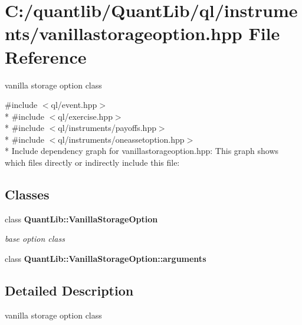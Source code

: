 \section{C\+:/quantlib/\+Quant\+Lib/ql/instruments/vanillastorageoption.hpp File Reference}
\label{vanillastorageoption_8hpp}


vanilla storage option class  


{\ttfamily \#include $<$ql/event.\+hpp$>$}\\*
{\ttfamily \#include $<$ql/exercise.\+hpp$>$}\\*
{\ttfamily \#include $<$ql/instruments/payoffs.\+hpp$>$}\\*
{\ttfamily \#include $<$ql/instruments/oneassetoption.\+hpp$>$}\\*
Include dependency graph for vanillastorageoption.\+hpp\+:
This graph shows which files directly or indirectly include this file\+:
\subsection*{Classes}
\begin{DoxyCompactItemize}
\item 
class {\bf Quant\+Lib\+::\+Vanilla\+Storage\+Option}
\begin{DoxyCompactList}\small\item\em base option class \end{DoxyCompactList}\item 
class {\bf Quant\+Lib\+::\+Vanilla\+Storage\+Option\+::arguments}
\end{DoxyCompactItemize}


\subsection{Detailed Description}
vanilla storage option class 

